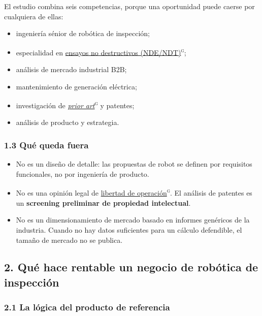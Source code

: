 \documentclass[11pt,a4paper]{article}
\begin{document}
El estudio combina seis competencias, porque una oportunidad puede caerse por cualquiera de ellas:

\begin{itemize}
\item ingeniería sénior de robótica de inspección;
\item especialidad en \hyperlink{g-nde}{ensayos no destructivos (NDE/NDT)}\textsuperscript{\textsc{g}};
\item análisis de mercado industrial B2B;
\item mantenimiento de generación eléctrica;
\item investigación de \hyperlink{g-prior-art}{\emph{prior art}}\textsuperscript{\textsc{g}} y patentes;
\item análisis de producto y estrategia.
\end{itemize}


\subsubsection*{1.3 Qué queda fuera}

\begin{itemize}
\item No es un diseño de detalle: las propuestas de robot se definen por requisitos funcionales, no por ingeniería de producto.
\item No es una opinión legal de \hyperlink{g-fto}{libertad de operación}\textsuperscript{\textsc{g}}. El análisis de patentes es un \textbf{screening preliminar de propiedad intelectual}.
\item No es un dimensionamiento de mercado basado en informes genéricos de la industria. Cuando no hay datos suficientes para un cálculo defendible, el tamaño de mercado no se publica.
\end{itemize}


\subsection*{2. Qué hace rentable un negocio de robótica de inspección}


\subsubsection*{2.1 La lógica del producto de referencia}
\end{document}
